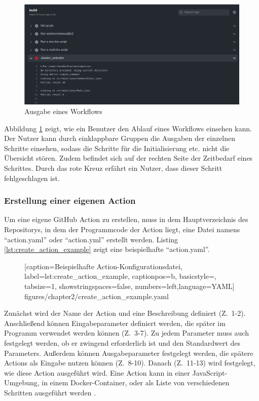 \begin{figure}[ht!]
    \centering
    \includegraphics[width=0.9\columnwidth]{figures/chapter2/workflow_output.png}
    \caption{Ausgabe eines Workflows}
    \label{fig:workflow_output}
\end{figure}

Abbildung \ref{fig:workflow_output} zeigt, wie ein Benutzer den Ablauf eines Workflows einsehen kann. Der Nutzer kann durch einklappbare Gruppen die Ausgaben der einzelnen Schritte einsehen, sodass die Schritte für die Initialisierung etc. nicht die Übersicht stören. Zudem befindet sich auf der rechten Seite der Zeitbedarf eines Schrittes. Durch das rote Kreuz erfährt ein Nutzer, dass dieser Schritt fehlgeschlagen ist. 


\subsubsection{Erstellung einer eigenen Action}
Um eine eigene GitHub Action zu erstellen, muss in dem Hauptverzeichnis des Repositorys, in dem der Programmcode der Action liegt, eine Datei namens \enquote{action.yaml} oder \enquote{action.yml} erstellt werden. Listing \ref{lst:create_action_example} zeigt eine beispielhafte \enquote{action.yaml}.
	\begin{figure}[h!]
			
			[caption={Beispielhafte Action-Konfigurationsdatei},
			label={lst:create_action_example},
			captionpos=b, basicstyle=\footnotesize, tabsize=1, showstringspaces=false,  numbers=left,language=YAML]
			{figures/chapter2/create_action_example.yaml}
		\end{figure}
Zunächst wird der Name der Action und eine Beschreibung definiert (Z.~1-2). Anschließend können Eingabeparameter definiert werden, die später im Programm verwendet werden können (Z.~3-7). Zu jedem Parameter muss auch festgelegt werden, ob er zwingend erforderlich ist und den Standardwert des Parameters. Außerdem können Ausgabeparameter festgelegt werden, die spätere Actions als Eingabe nutzen können (Z.~8-10). Danach (Z.~11-13) wird festgelegt, wie diese Action ausgeführt wird. Eine Action kann in einer JavaScript-Umgebung, in einem Docker-Container, oder als Liste von verschiedenen Schritten ausgeführt werden \cite[S. 117ff.]{github_action_book}. 

